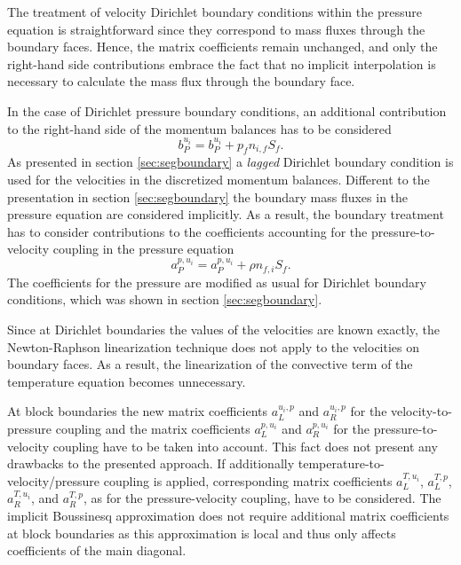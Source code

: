 The treatment of velocity Dirichlet boundary conditions within the pressure equation is straightforward since they correspond to mass fluxes through the boundary faces. Hence, the matrix coefficients remain unchanged, and only the right-hand side contributions embrace the fact that no implicit interpolation is necessary to calculate the mass flux through the boundary face.

In the case of Dirichlet pressure boundary conditions, an additional contribution to the right-hand side of the momentum balances has to be considered
\begin{displaymath}
  b_P^{u_i} = b_P^{u_i} + p_f n_{i,f} S_f.
\end{displaymath}
As presented in section \ref{sec:segboundary} a \emph{lagged} Dirichlet boundary condition is used for the velocities in the discretized momentum balances. Different to the presentation in section \ref{sec:segboundary} the boundary mass fluxes in the pressure equation are considered implicitly. As a result, the boundary treatment has to consider contributions to the coefficients accounting for the pressure-to-velocity coupling in the pressure equation
\begin{displaymath}
  a_P^{p,u_i} = a_P^{p,u_i} + \rho n_{f,i} S_f.
\end{displaymath}
The coefficients for the pressure are modified as usual for Dirichlet boundary conditions, which was shown in section \ref{sec:segboundary}.

Since at Dirichlet boundaries the values of the velocities are known exactly, the Newton-Raphson linearization technique does not apply to the velocities on boundary faces. As a result, the linearization of the convective term of the temperature equation becomes unnecessary.

At block boundaries the new matrix coefficients \(a_L^{u_i,p}\) and \(a_R^{u_i,p}\) for the velocity-to-pressure coupling and the matrix coefficients \(a_L^{p,u_i}\) and \(a_R^{p,u_i}\) for the pressure-to-velocity coupling have to be taken into account. This fact does not present any drawbacks to the presented approach. If additionally temperature-to-velocity/pressure coupling is applied, corresponding matrix coefficients \(a_L^{T,u_i}\), \(a_L^{T,p}\), \(a_R^{T,u_i}\), and \(a_R^{T,p}\), as for the pressure-velocity coupling, have to be considered. The implicit Boussinesq approximation does not require additional matrix coefficients at block boundaries as this approximation is local and thus only affects coefficients of the main diagonal.

